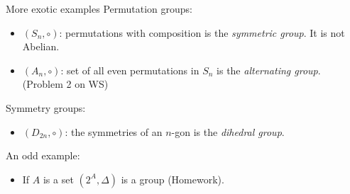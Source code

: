 \documentclass{beamer}
\def\itemb{\begin{itemize}}
\def\iteme{\end{itemize}}
\begin{document}
\begin{frame}{More exotic examples}
Permutation groups:
\itemb
\item $(S_n,\circ)$: permutations with composition is the \textit{symmetric group}. It is not Abelian.
\item $(A_n,\circ)$: set of all even permutations in $S_n$ is the \textit{alternating group}. (Problem 2 on WS)
\iteme
Symmetry groups:
\itemb
\item $(D_{2n},\circ)$: the symmetries of an $n$-gon is the \textit{dihedral group}.
\iteme
An odd example:
\itemb
\item If $A$ is a set $(2^A,\Delta)$ is a group (Homework).
\iteme
\end{frame}
\end{document}
